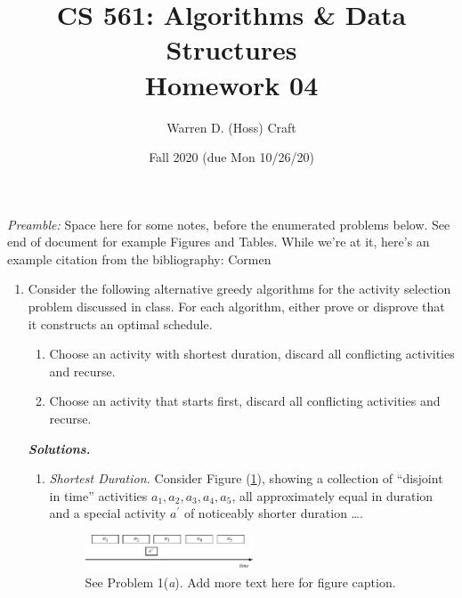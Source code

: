 \documentclass{article}
\title{CS 561: Algorithms \& Data Structures\\
Homework 04}
\author{Warren D. (Hoss) Craft}
\date{Fall 2020 (due Mon 10/26/20)}
\begin{document}
\maketitle

\flushleft

\textit{Preamble:} Space here for some notes, before the enumerated problems below. See end of document for example Figures and Tables. While we're at it, here's an example citation from the bibliography: Cormen \cite{Cormen_Algorithms:2009}

\begin{enumerate}[label=\textbf{(\arabic*)}]


\item Consider the following alternative greedy algorithms for the activity selection problem discussed in class. For each algorithm, either prove or disprove that it constructs an optimal schedule.

  \begin{enumerate} %
  
    \item Choose an activity with shortest duration, discard all conflicting activities and recurse.
    
    \item Choose an activity that starts first, discard all conflicting activities and recurse.
    
  \end{enumerate} %

\vspace{0.1in}


\textbf{\textit{Solutions.}}

  \begin{enumerate} %
    \item \textit{Shortest Duration.} Consider Figure (\ref{fig:Example_Figure_01}), showing a collection of ``disjoint in time'' activities $a_1, a_2, a_3, a_4, a_5$, all approximately equal in duration and a special activity $a^{\prime}$ of noticeably shorter duration \ldots .
    
    \vspace{0.1in}
    
    \begin{figure}[hbtp]
    \captionsetup{font=small, width = 10cm}
    \centering
       \centering
       \includegraphics[width = 0.5\textwidth]{FIGURES/Example_Figure_01.pdf}
    \caption{See Problem 1(\textit{a}). Add more text here for figure caption.}
    \label{fig:Example_Figure_01}
    \end{figure}
    

\end{enumerate}
\end{enumerate}
\end{document}
